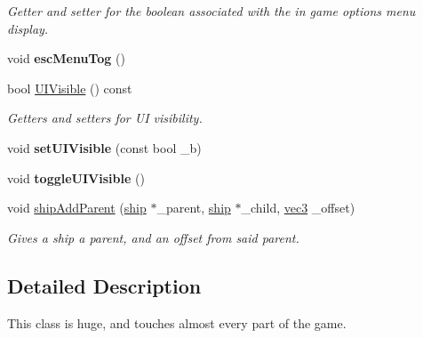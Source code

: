\begin{DoxyCompactItemize}
\begin{DoxyCompactList}\small\item\em Getter and setter for the boolean associated with the in game options menu display. \end{DoxyCompactList}\item 
\hypertarget{classuniverse_a70c60dc136b8466aee31f314bbaa20c8}{void {\bfseries esc\-Menu\-Tog} ()}\label{classuniverse_a70c60dc136b8466aee31f314bbaa20c8}

\item 
\hypertarget{classuniverse_aeac69d5ee3f92bbfd9a66ed9ce41df82}{bool \hyperlink{classuniverse_aeac69d5ee3f92bbfd9a66ed9ce41df82}{U\-I\-Visible} () const }\label{classuniverse_aeac69d5ee3f92bbfd9a66ed9ce41df82}

\begin{DoxyCompactList}\small\item\em Getters and setters for U\-I visibility. \end{DoxyCompactList}\item 
\hypertarget{classuniverse_a096b56203fa8b57e10b7bc7f57eb6861}{void {\bfseries set\-U\-I\-Visible} (const bool \-\_\-b)}\label{classuniverse_a096b56203fa8b57e10b7bc7f57eb6861}

\item 
\hypertarget{classuniverse_a4756c43cd7d9852d1fa1a3b6e241a57c}{void {\bfseries toggle\-U\-I\-Visible} ()}\label{classuniverse_a4756c43cd7d9852d1fa1a3b6e241a57c}

\item 
void \hyperlink{classuniverse_a71dd4cdc7489ee3d8daabf37e3b65e3d}{ship\-Add\-Parent} (\hyperlink{classship}{ship} $\ast$\-\_\-parent, \hyperlink{classship}{ship} $\ast$\-\_\-child, \hyperlink{structvec3}{vec3} \-\_\-offset)
\begin{DoxyCompactList}\small\item\em Gives a ship a parent, and an offset from said parent. \end{DoxyCompactList}\end{DoxyCompactItemize}


\subsection{Detailed Description}
This class is huge, and touches almost every part of the game. 

